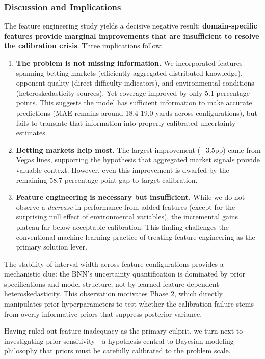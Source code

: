\subsubsection{Discussion and Implications}

The feature engineering study yields a decisive negative result: \textbf{domain-specific features provide marginal improvements that are insufficient to resolve the calibration crisis}. Three implications follow:

\begin{enumerate}
    \item \textbf{The problem is not missing information.} We incorporated features spanning betting markets (efficiently aggregated distributed knowledge), opponent quality (direct difficulty indicators), and environmental conditions (heteroskedasticity sources). Yet coverage improved by only 5.1 percentage points. This suggests the model has sufficient information to make accurate predictions (MAE remains around 18.4-19.0 yards across configurations), but fails to translate that information into properly calibrated uncertainty estimates.

    \item \textbf{Betting markets help most.} The largest improvement (+3.5pp) came from Vegas lines, supporting the hypothesis that aggregated market signals provide valuable context. However, even this improvement is dwarfed by the remaining 58.7 percentage point gap to target calibration.

    \item \textbf{Feature engineering is necessary but insufficient.} While we do not observe a \textit{decrease} in performance from added features (except for the surprising null effect of environmental variables), the incremental gains plateau far below acceptable calibration. This finding challenges the conventional machine learning practice of treating feature engineering as the primary solution lever.
\end{enumerate}

The stability of interval width across feature configurations provides a mechanistic clue: the BNN's uncertainty quantification is dominated by prior specifications and model structure, not by learned feature-dependent heteroskedasticity. This observation motivates Phase 2, which directly manipulates prior hyperparameters to test whether the calibration failure stems from overly informative priors that suppress posterior variance.

Having ruled out feature inadequacy as the primary culprit, we turn next to investigating prior sensitivity—a hypothesis central to Bayesian modeling philosophy that priors must be carefully calibrated to the problem scale.

